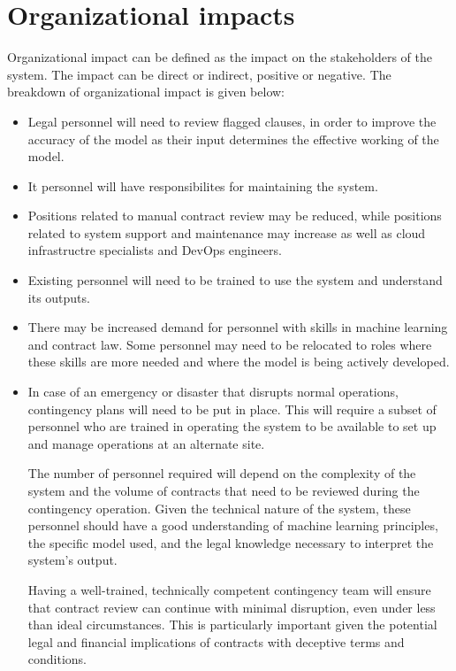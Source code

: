 \section{Organizational impacts \label{Section::Organizational Impacts}}
Organizational impact can be defined as the impact on the stakeholders of the system. The impact can be direct or indirect, positive or negative. The breakdown of organizational impact is given below: 
\begin{itemize}
    \item Legal personnel will need to review flagged clauses, in order to improve the accuracy of the model as their input determines the effective working of the model. 
    \item It personnel will have responsibilites for maintaining the system. 
    \item Positions related to manual contract review may be reduced, while positions related to system support and maintenance may increase as well as cloud infrastructre specialists and DevOps engineers. 
    \item Existing personnel will need to be trained to use the system and understand its outputs.

    \item There may be increased demand for personnel with skills in machine learning and contract law. Some personnel may need to be relocated to roles where these skills are more needed and where the model is being actively developed. 
    \item In case of an emergency or disaster that disrupts normal operations, contingency plans will need to be put in place. This will require a subset of personnel who are trained in operating the system to be available to set up and manage operations at an alternate site.

The number of personnel required will depend on the complexity of the system and the volume of contracts that need to be reviewed during the contingency operation. Given the technical nature of the system, these personnel should have a good understanding of machine learning principles, the specific model used, and the legal knowledge necessary to interpret the system's output.

Having a well-trained, technically competent contingency team will ensure that contract review can continue with minimal disruption, even under less than ideal circumstances. This is particularly important given the potential legal and financial implications of contracts with deceptive terms and conditions.




\end{itemize}




